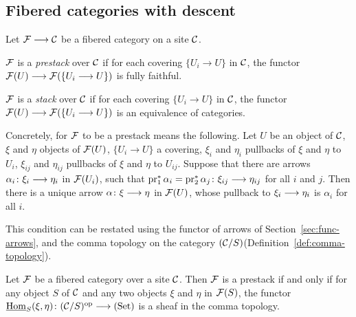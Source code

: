 \begin{4   STACKS}
\begin{4.1 Descent of objects of fibcats}
\subsection{Fibered categories with descent}
\label{sec:fibered-descent}

\begin{definition} Let $\cF \arr \cC$ be a fibered category on a site $\mathcal{C}$.

\begin{enumeratei}

\item $\mathcal{F}$ is a \emph{prestack}%
 over $\mathcal{C}$ if for each covering $\{U_i \to U\}$ in $\mathcal{C}$, the functor $\cF(U) \arr \cF(\{U_i \to U\})$ is fully faithful.

\item $\mathcal{F}$ is a \emph{stack}%
 over $\mathcal{C}$ if for each covering $\{U_i \to U\}$ in $\mathcal{C}$, the functor $\cF(U) \arr \cF(\{U_i \to U\})$ is an equivalence of categories.

\end{enumeratei}
\end{definition}

Concretely, for $\mathcal{F}$ to be a prestack means the following. Let $U$ be an object of $\mathcal{C}$, $\xi$ and $\eta$ objects of $\mathcal{F}(U)$, $\{U_i \to U\}$ a covering, $\xi_i$ and $\eta_i$ pullbacks of $\xi$ and $\eta$ to $U_i$, $\xi_{ij}$ and $\eta_{ij}$ pullbacks of $\xi$ and $\eta$ to $U_{ij}$. Suppose that there are arrows $\alpha_i \colon \xi_i \arr \eta_i$ in $\mathcal{F}(U_i)$, such that $\pr_1^* \alpha_i = \pr_2^* \alpha_j \colon \xi_{ij}  \arr \eta_{ij}$ for all $i$ and $j$. Then there is a unique arrow $\alpha \colon \xi \arr \eta$ in $\mathcal{F}(U)$, whose pullback to $\xi_i \arr \eta_i$ is $\alpha_i$ for all $i$.

This condition can be restated using the functor of arrows of Section~\ref{sec:func-arrows}, and the comma topology on the category $(\mathcal{C}/S)$(Definition~\ref{def:comma-topology}).


\begin{proposition}
Let $\mathcal{F}$ be a fibered category over a site $\mathcal{C}$. Then $\mathcal{F}$ is a prestack if and only if for any object $S$ of $\mathcal{C}$ and any two objects $\xi$ and $\eta$ in $\mathcal{F}(S)$, the functor $\underhom_S(\xi, \eta) \colon (\cC/S)\op \arr \catset$ is a sheaf in the comma topology.
\end{proposition}



\end{4.1 Descent of objects of fibcats}
\end{4   STACKS}
